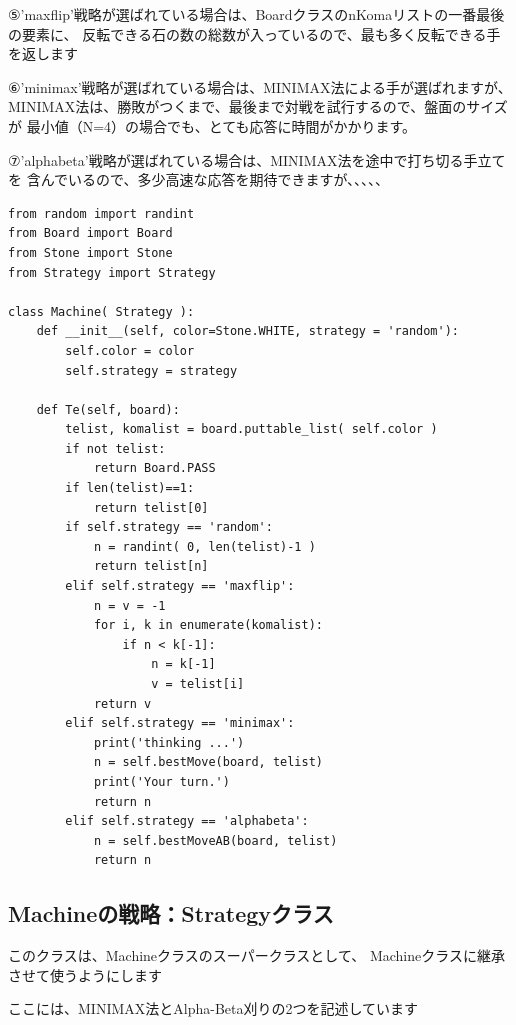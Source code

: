 \documentclass[uplatex,a4paper,11pt,oneside,openany]{jsbook}
\begin{document}
⑤'maxflip'戦略が選ばれている場合は、BoardクラスのnKomaリストの一番最後の要素に、
反転できる石の数の総数が入っているので、最も多く反転できる手を返します

⑥'minimax'戦略が選ばれている場合は、MINIMAX法による手が選ばれますが、
MINIMAX法は、勝敗がつくまで、最後まで対戦を試行するので、盤面のサイズが
最小値（N=4）の場合でも、とても応答に時間がかかります。

⑦'alphabeta'戦略が選ばれている場合は、MINIMAX法を途中で打ち切る手立てを
含んでいるので、多少高速な応答を期待できますが、、、、、

\begin{lstlisting}[caption=Machine class,label=othello02]
from random import randint
from Board import Board
from Stone import Stone
from Strategy import Strategy

class Machine( Strategy ):
    def __init__(self, color=Stone.WHITE, strategy = 'random'):
        self.color = color
        self.strategy = strategy

    def Te(self, board):
        telist, komalist = board.puttable_list( self.color )
        if not telist:
            return Board.PASS
        if len(telist)==1:
            return telist[0]
        if self.strategy == 'random':
            n = randint( 0, len(telist)-1 )
            return telist[n]
        elif self.strategy == 'maxflip':
            n = v = -1
            for i, k in enumerate(komalist):
                if n < k[-1]:
                    n = k[-1]
                    v = telist[i]
            return v
        elif self.strategy == 'minimax':
            print('thinking ...')
            n = self.bestMove(board, telist)
            print('Your turn.')
            return n
        elif self.strategy == 'alphabeta':
            n = self.bestMoveAB(board, telist)
            return n
\end{lstlisting}

\subsection{Machineの戦略：Strategyクラス}

このクラスは、Machineクラスのスーパークラスとして、
Machineクラスに継承させて使うようにします

ここには、MINIMAX法とAlpha-Beta刈りの2つを記述しています
\end{document}
